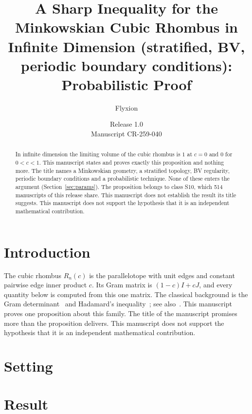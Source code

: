 \documentclass[11pt]{article}
\title{A Sharp Inequality for the Minkowskian Cubic Rhombus in Infinite Dimension (stratified, BV, periodic boundary conditions): Probabilistic Proof}
\author{Flyxion}
\date{Release 1.0\\ Manuscript CR-259-040}
\begin{document}
\maketitle
\begin{abstract}
In infinite dimension the limiting volume of the cubic rhombus is $1$ at $c=0$ and $0$ for $0<c<1$. This manuscript states and proves exactly this proposition and nothing more. The title names a Minkowskian geometry, a stratified topology, BV regularity, periodic boundary conditions and a probabilistic technique. None of these enters the argument (Section~\ref{sec:params}). The proposition belongs to class S10, which 514 manuscripts of this release share. This manuscript does not establish the result its title suggests. This manuscript does not support the hypothesis that it is an independent mathematical contribution.
\end{abstract}

\section{Introduction}
The cubic rhombus $R_n(c)$ is the parallelotope with unit edges and constant pairwise edge inner product $c$. Its Gram matrix is $(1-c)I+cJ$, and every quantity below is computed from this one matrix. The classical background is the Gram determinant~\cite{gram} and Hadamard's inequality~\cite{hadamard}; see also~\cite{hj}.
This manuscript proves one proposition about this family. The title of the manuscript promises more than the proposition delivers. This manuscript does not support the hypothesis that it is an independent mathematical contribution.

\section{Setting}


\section{Result}

\end{document}
